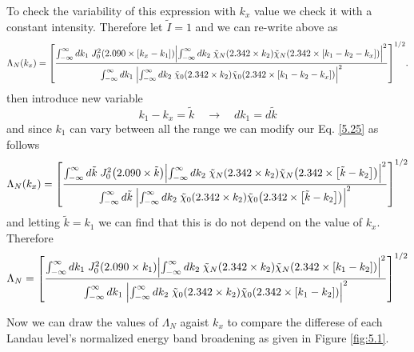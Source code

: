 \noindent
To check the variability of this expression with $k_x$ value we check it with a constant intensity. Therefore let $\tilde{I}=1$ and we can re-write above as
\begin{equation} \label{5.25}
    \Lambda_N (k_x) =
    \qty[
    \frac
    {\int_{-\infty}^{\infty} d {k}_1 \;
    J_0^2\qty(2.090\times[{k}_x - {k}_1])
    \qty|
    \int_{-\infty}^{\infty} d{k}_2 \;
    \tilde{\chi}_{N}\qty(2.342 \times k_2)
    \tilde{\chi}_{N}\qty(2.342 \times \qty[{k}_1 - {k}_2 - {k}_x])|^2}
    {\int_{-\infty}^{\infty} d {k}_1 \;
    \qty|
    \int_{-\infty}^{\infty} d{k}_2 \;
    \tilde{\chi}_{0}\qty(2.342 \times k_2)
    \tilde{\chi}_{0}\qty(2.342 \times \qty[{k}_1 - {k}_2 - {k}_x])|^2}
    ]^{1/2}.
\end{equation}
then introduce new variable
\begin{equation} \label{5.26}
  k_1 - k_x = \tilde{k} \quad \longrightarrow \quad dk_1 = d\tilde{k}
\end{equation}
and since $k_1$ can vary between all the range we can modify our Eq. \eqref{5.25} as follows
\begin{equation} \label{5.27}
    \Lambda_N (k_x) =
    \qty[
    \frac
    {\int_{-\infty}^{\infty} d \tilde{k} \;
    J_0^2\qty(2.090\times \tilde{k})
    \qty|
    \int_{-\infty}^{\infty} d{k}_2 \;
    \tilde{\chi}_{N}\qty(2.342 \times k_2)
    \tilde{\chi}_{N}\qty(2.342 \times \qty[\tilde{k}- {k}_2])|^2}
    {\int_{-\infty}^{\infty} d \tilde{k} \;
    \qty|
    \int_{-\infty}^{\infty} d{k}_2 \;
    \tilde{\chi}_{0}\qty(2.342 \times k_2)
    \tilde{\chi}_{0}\qty(2.342 \times \qty[\tilde{k} - {k}_2])|^2}
    ]^{1/2}
\end{equation}
and letting $\tilde{k} = k_1$ we can find that this is do not depend on the value of $k_x$. Therefore
\begin{equation} \label{5.28}
    \Lambda_N =
    \qty[
    \frac
    {\int_{-\infty}^{\infty} d k_1 \;
    J_0^2\qty(2.090\times k_1)
    \qty|
    \int_{-\infty}^{\infty} d{k}_2 \;
    \tilde{\chi}_{N}\qty(2.342 \times k_2)
    \tilde{\chi}_{N}\qty(2.342 \times \qty[k_1 - {k}_2])|^2}
    {\int_{-\infty}^{\infty} d k_1\;
    \qty|
    \int_{-\infty}^{\infty} d{k}_2 \;
    \tilde{\chi}_{0}\qty(2.342 \times k_2)
    \tilde{\chi}_{0}\qty(2.342 \times \qty[k_1 - {k}_2])|^2}
    ]^{1/2}
\end{equation}

\noindent
Now we can draw the values of $\Lambda_N$ agaist $k_x$ to compare the differese of each Landau level's normalized energy band broadening as given in Figure \ref{fig:5.1}.

